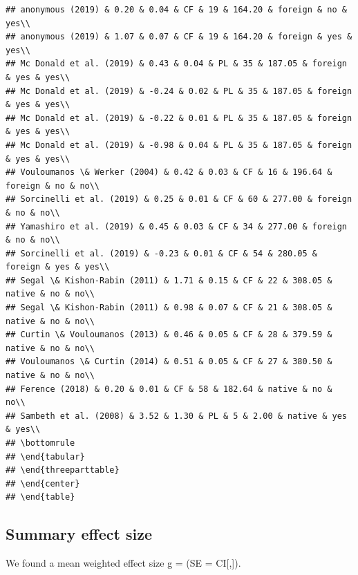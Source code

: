 \documentclass[man]{apa6}
\begin{document}
\begin{verbatim}
## anonymous (2019) & 0.20 & 0.04 & CF & 19 & 164.20 & foreign & no & yes\\
## anonymous (2019) & 1.07 & 0.07 & CF & 19 & 164.20 & foreign & yes & yes\\
## Mc Donald et al. (2019) & 0.43 & 0.04 & PL & 35 & 187.05 & foreign & yes & yes\\
## Mc Donald et al. (2019) & -0.24 & 0.02 & PL & 35 & 187.05 & foreign & yes & yes\\
## Mc Donald et al. (2019) & -0.22 & 0.01 & PL & 35 & 187.05 & foreign & yes & yes\\
## Mc Donald et al. (2019) & -0.98 & 0.04 & PL & 35 & 187.05 & foreign & yes & yes\\
## Vouloumanos \& Werker (2004) & 0.42 & 0.03 & CF & 16 & 196.64 & foreign & no & no\\
## Sorcinelli et al. (2019) & 0.25 & 0.01 & CF & 60 & 277.00 & foreign & no & no\\
## Yamashiro et al. (2019) & 0.45 & 0.03 & CF & 34 & 277.00 & foreign & no & no\\
## Sorcinelli et al. (2019) & -0.23 & 0.01 & CF & 54 & 280.05 & foreign & yes & yes\\
## Segal \& Kishon-Rabin (2011) & 1.71 & 0.15 & CF & 22 & 308.05 & native & no & no\\
## Segal \& Kishon-Rabin (2011) & 0.98 & 0.07 & CF & 21 & 308.05 & native & no & no\\
## Curtin \& Vouloumanos (2013) & 0.46 & 0.05 & CF & 28 & 379.59 & native & no & no\\
## Vouloumanos \& Curtin (2014) & 0.51 & 0.05 & CF & 27 & 380.50 & native & no & no\\
## Ference (2018) & 0.20 & 0.01 & CF & 58 & 182.64 & native & no & no\\
## Sambeth et al. (2008) & 3.52 & 1.30 & PL & 5 & 2.00 & native & yes & yes\\
## \bottomrule
## \end{tabular}
## \end{threeparttable}
## \end{center}
## \end{table}
\end{verbatim}

\subsection{Summary effect size}\label{summary-effect-size}

We found a mean weighted effect size g = (SE = CI{[},{]}).
\end{document}
